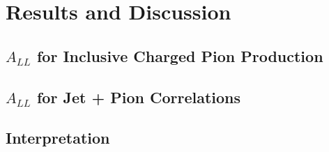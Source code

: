 \chapter{Results and Discussion}

\section{$A_{LL}$ for Inclusive Charged Pion Production}

\section{$A_{LL}$ for Jet + Pion Correlations}

\section{Interpretation}
